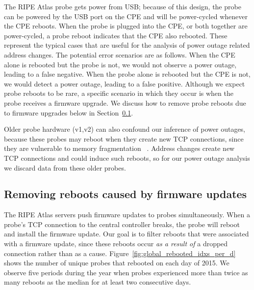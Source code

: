 The RIPE Atlas probe gets power from USB; because of this
design, the probe can be powered by the USB port on the CPE and
will be power-cycled whenever the CPE reboots. When the probe
is plugged into the CPE, or both together are power-cycled,
a probe reboot indicates that the CPE also rebooted. 
These represent the 
typical cases that are useful for the  analysis of power outage related address changes.  The
potential error scenarios are as follows. When the CPE
alone is rebooted but the probe is not, we would not observe a
power outage, leading to a false negative. 
When the probe alone is rebooted but the CPE is not, we
would detect a power outage, leading to a false positive.
Although we expect probe reboots to be rare, a specific scenario in which they occur is when the probe receives a 
firmware upgrade. We discuss how to remove probe reboots due to firmware upgrades below in Section~\ref{sec:firmware}.

Older probe hardware (v1,v2) can also confound our inference of power
outages, because these probes may reboot when they create new TCP
connections, since they are vulnerable to memory fragmentation
~\cite{atlas-fragmentation}. Address changes create new TCP
connections and could induce such reboots, so for our power
outage analysis we discard data from these older probes.


\subsection{Removing reboots caused by firmware updates}
\label{sec:firmware}

The RIPE Atlas servers push firmware updates to probes
simultaneously. When a probe's TCP connection to the central controller
breaks, the probe will reboot and install the firmware update.
Our goal is to filter reboots that were associated with a firmware update,
since these reboots occur \emph{as a result of} a dropped connection rather
than as a cause.  
Figure~\ref{fig:global_rebooted_idxs_per_d} shows the number
of unique probes that rebooted on each day of 2015. We observe five
periods during the year when probes experienced more than twice as many reboots
as the median for at least two consecutive days.

